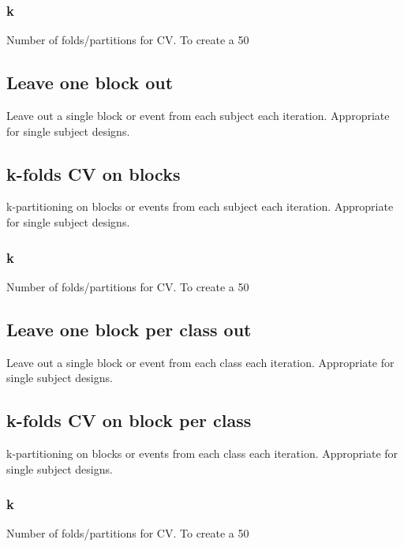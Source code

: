 \subsubsection{k}
Number of folds/partitions for CV. To create a 50%


\subsection{Leave one block out}
Leave out a single block or event from each subject each iteration. Appropriate for single subject designs.


\subsection{k-folds CV on blocks}
k-partitioning on blocks or events from each subject each iteration. Appropriate for single subject designs.


\subsubsection{k}
Number of folds/partitions for CV. To create a 50%


\subsection{Leave one block per class out}
Leave out a single block or event from each class each iteration. Appropriate for single subject designs.


\subsection{k-folds CV on block per class}
k-partitioning on blocks or events from each class each iteration. Appropriate for single subject designs.


\subsubsection{k}
Number of folds/partitions for CV. To create a 50%


